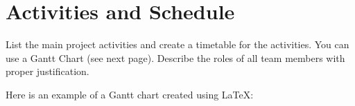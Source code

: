 \documentclass[mstat,12pt]{unswthesis}
\begin{document}
\hypertarget{activities-and-schedule}{%
\section{Activities and Schedule}\label{activities-and-schedule}}

List the main project activities and create a timetable for the
activities. You can use a Gantt Chart (see next page). Describe the
roles of all team members with proper justification.

\newpage

Here is an example of a Gantt chart created using \LaTeX:

\renewcommand\sfdefault{phv}
\renewcommand\mddefault{mc}
\renewcommand\bfdefault{bc}
\sffamily
\end{document}
